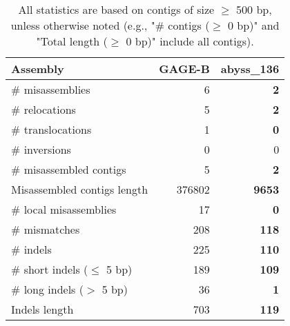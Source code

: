 \documentclass[12pt,a4paper]{article}
\begin{document}
\begin{table}[ht]
\begin{center}
\caption{All statistics are based on contigs of size $\geq$ 500 bp, unless otherwise noted (e.g., "\# contigs ($\geq$ 0 bp)" and "Total length ($\geq$ 0 bp)" include all contigs).}
\begin{tabular}{|l*{2}{|r}|}
\hline
Assembly & GAGE-B & abyss\_136 \\ \hline
\# misassemblies & 6 & {\bf 2} \\ \hline
\hspace{5mm}\# relocations & 5 & {\bf 2} \\ \hline
\hspace{5mm}\# translocations & 1 & {\bf 0} \\ \hline
\hspace{5mm}\# inversions & 0 & 0 \\ \hline
\# misassembled contigs & 5 & {\bf 2} \\ \hline
Misassembled contigs length & 376802 & {\bf 9653} \\ \hline
\# local misassemblies & 17 & {\bf 0} \\ \hline
\# mismatches & 208 & {\bf 118} \\ \hline
\# indels & 225 & {\bf 110} \\ \hline
\hspace{5mm}\# short indels ($\leq$ 5 bp) & 189 & {\bf 109} \\ \hline
\hspace{5mm}\# long indels ($>$ 5 bp) & 36 & {\bf 1} \\ \hline
Indels length & 703 & {\bf 119} \\ \hline
\end{tabular}
\end{center}
\end{table}
\end{document}
